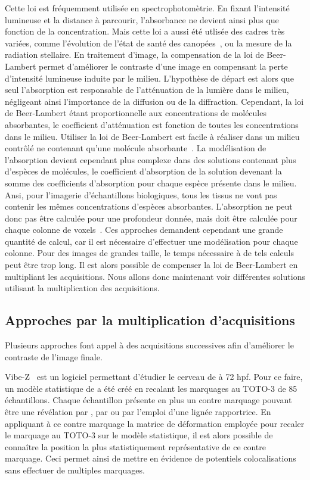 \documentclass[\main/main.tex]{subfiles}
\begin{document}
%
Cette loi est fréquemment utilisée en spectrophotomètrie. En fixant l'intensité lumineuse et la distance à parcourir, l'absorbance ne devient ainsi plus que fonction de la concentration.
%
Mais cette loi a aussi été utlisée des cadres très variées, comme l'évolution de l'état de santé des canopées~\cite{demattos_2020, liu_2020a}, ou la mesure de la radiation stellaire.
%
En traitement d'image, la compensation de la loi de Beer-Lambert permet d'améliorer le contraste d'une image en compensant la perte d'intensité lumineuse induite par le milieu. L'hypothèse de départ est alors que seul l'absorption est responsable de l'atténuation de la lumière dans le milieu,
négligeant ainsi l'importance de la diffusion ou de la diffraction.
%
Cependant, la loi de Beer-Lambert étant proportionnelle aux concentrations de molécules absorbantes, le coefficient d'atténuation est fonction de toutes les concentrations dans le milieu.
%
Utiliser la loi de Beer-Lambert est facile à réaliser dans un milieu contrôlé ne contenant qu'une molécule absorbante~\cite{mikulewitsch_2018}. La modélisation de l'absorption devient cependant plus complexe dans des solutions contenant plus d'espèces de molécules, le coefficient d'absorption de la solution devenant la somme des coefficients d'absorption pour chaque espèce présente dans le milieu.
%
Ansi, pour l'imagerie d'échantillons biologiques, tous les tissus ne vont pas contenir les mêmes concentrations d'espèces absorbantes. L'absorption ne peut donc pas être calculée pour une profondeur donnée, mais doit être calculée pour chaque colonne de voxels~\cite{ohser_2020,nylk_2018,parker_2020}.
%
Ces approches demandent cependant une grande quantité de calcul,
car il est nécessaire d'effectuer une modélisation pour chaque colonne. Pour des images de grandes taille, le temps nécessaire à de tels calculs peut être trop long.
%
Il est alors possible de compenser la loi de Beer-Lambert en multipliant les acquisitions.
%
Nous allons donc maintenant voir différentes solutions utilisant la multiplication des acquisitions.

\subsection{Approches par la multiplication d'acquisitions}

Plusieurs approches font appel à des acquisitions successives afin d'améliorer le contraste de l'image finale.
%

%
Vibe-Z~\cite{ronneberger_2015} est un logiciel permettant d'étudier le cerveau de \pz{} à 72 hpf.
%
Pour ce faire, un modèle statistique de \pz{} a été créé en recalant les marquages au TOTO-3 de 85 échantillons.
%
Chaque échantillon présente en plus un contre marquage pouvant être une révélation par \fish{}, par \ihcie{} ou par l'emploi d'une lignée rapportrice. 
%
En appliquant à ce contre marquage la matrice de déformation employée pour recaler le marquage au TOTO-3 sur le modèle statistique, il est alors possible de connaître la position la plus statistiquement représentative de ce contre marquage.
%
Ceci permet ainsi de mettre en évidence de potentiels colocalisations sans effectuer de multiples marquages.
\end{document}
